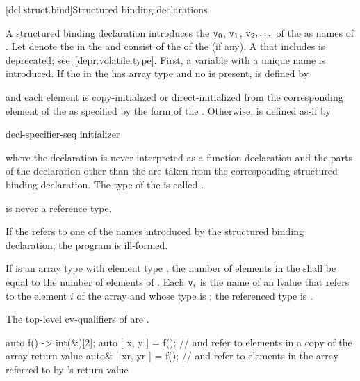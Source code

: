 \documentclass{wg21}
\begin{document}
[dcl.struct.bind]{Structured binding declarations}%
%
%

\pnum
A structured binding declaration introduces the 
$\texttt{v}_0$, $\texttt{v}_1$, $\texttt{v}_2, \dotsc$
of the
 as names
of .
Let \cv{} denote the  in
the  and
 consist of the  of
the  (if any).
A \cv{} that includes  is deprecated;
see~\ref{depr.volatile.type}.
First, a variable with a unique name  is introduced. If the
 in the 
has array type   and no  is present,
 is defined by
\begin{ncbnf}
      \cv{}   \terminal{;}
\end{ncbnf}
and each element is copy-initialized or direct-initialized
from the corresponding element of the  as specified
by the form of the .
Otherwise, 
is defined as-if by
\begin{ncbnf}
     decl-specifier-seq   initializer \terminal{;}
\end{ncbnf}
where
the declaration is never interpreted as a function declaration and
the parts of the declaration other than the  are taken
from the corresponding structured binding declaration.
The type of the 
 is called .
\begin{note}
     is never a reference type.
\end{note}

\pnum
If the  refers to
one of the names introduced by the structured binding declaration,
the program is ill-formed.

\pnum
If  is an array type with element type , the number
of elements in the  shall be equal to the
number of elements of . Each $\texttt{v}_i$ is the name of an
lvalue that refers to the element $i$ of the array and whose type
is ; the referenced type is .
\begin{note}
    The top-level cv-qualifiers of  are \cv.
\end{note}
\begin{example}
    \begin{codeblock}
        auto f() -> int(&)[2];
        auto [ x, y ] = f();            //  and  refer to elements in a copy of the array return value
        auto& [ xr, yr ] = f();         //  and  refer to elements in the array referred to by 's return value
    \end{codeblock}
\end{example}
\end{document}
